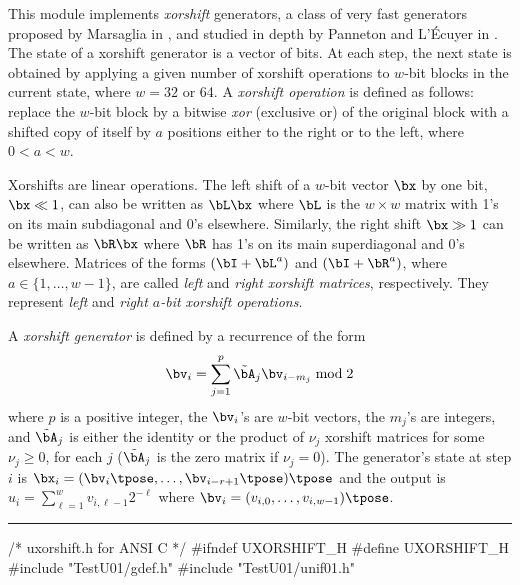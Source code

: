 
\def\OP{\mathop {H}\nolimits}

This module implements \emph{xorshift} generators, a class of very fast
 generators proposed by Marsaglia in \cite{rMAR03a}, and studied
in depth by Panneton and L'\'Ecuyer in  \cite{rPAN04c}.
The state of a xorshift generator is a vector of bits. At each
step, the next state is obtained by applying a given number of
xorshift operations to $w$-bit blocks in the current state, where
$w=32$ or 64. A \emph{xorshift operation} is defined as
follows: replace the $w$-bit block by a bitwise \emph{xor} (exclusive or)
of the original block with a shifted copy of itself by $a$ positions
either to the right or to the left, where $0 < a < w$.

Xorshifts are linear operations.
The left shift of a $w$-bit vector $\bx$ by one bit, $\bx \ll 1$,
can also be written as $\bL\bx$ where $\bL$ is the $w\times w$ matrix
with 1's on its main subdiagonal and 0's elsewhere.
Similarly, the right shift $\bx \gg 1$ can be written as $\bR\bx$
where $\bR$ has 1's on its main superdiagonal and 0's elsewhere.
Matrices of the forms $(\bI+\bL^{a})$ and $(\bI+\bR^{a})$,
where $a \in \{1,\dots,w-1\}$, are called
\emph{left} and \emph{right xorshift matrices}, respectively.
They represent \emph{left} and \emph{right $a$-bit xorshift operations}.


A \emph{xorshift generator} is defined by a recurrence of the form
\begin{equation}
\label{eq:MRMMprime}
 \bv_i = \sum_{j=1}^p \tilde{\bA}_j \bv_{i-m_j} \bmod 2
\end{equation}
where $p$ is a positive integer, the $\bv_i$'s are $w$-bit vectors, 
the $m_j$'s are integers,
and $\tilde{\bA}_j$ is either the identity or the product of 
$\nu_j$ xorshift matrices for some $\nu_j\ge 0$, 
for each $j$ ($\tilde{\bA}_j$ is the zero matrix if $\nu_j = 0$).
The generator's state at step $i$ is 
$\bx_i = (\bv_i\tpose,\ldots,\bv_{i-r+1}\tpose)\tpose$ and
the output is $u_i = \sum_{\ell=1}^w v_{i,\ell-1} 2^{-\ell}$
where $\bv_i = (v_{i,0},\dots,v_{i,w-1})\tpose$.

\bigskip
\hrule
\code
\hide
/*  uxorshift.h  for ANSI C */
#ifndef UXORSHIFT_H
#define UXORSHIFT_H
\endhide
#include "TestU01/gdef.h"
#include "TestU01/unif01.h"


